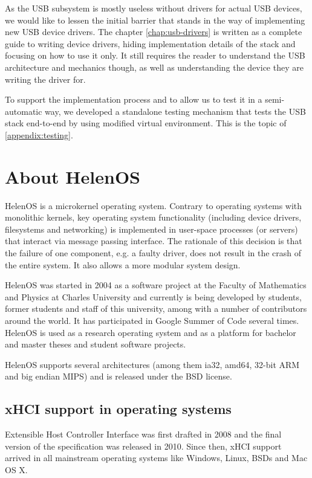 As the USB subsystem is mostly useless without drivers for actual USB devices,
we would like to lessen the initial barrier that stands in the way of
implementing new USB device drivers. The chapter \ref{chap:usb-drivers} is
written as a complete guide to writing device drivers, hiding implementation
details of the stack and focusing on how to use it only. It still requires the
reader to understand the USB architecture and mechanics though, as well as
understanding the device they are writing the driver for.

To support the implementation process and to allow us to test it in
a semi-automatic way, we developed a standalone testing mechanism that tests
the USB stack end-to-end by using modified virtual environment. This is the
topic of \ref{appendix:testing}.

\section{About HelenOS}
HelenOS is a microkernel operating system. Contrary to operating systems with
monolithic kernels, key operating system functionality (including device
drivers, filesystems and networking) is implemented in user-space processes (or
servers) that interact via message passing interface. The rationale of this
decision is that the failure of one component, e.g. a faulty driver, does not
result in the crash of the entire system. It also allows a more modular system
design.

HelenOS was started in 2004 as a software project at the Faculty of Mathematics
and Physics at Charles University and currently is being developed by students,
former students and staff of this university, among with a number of
contributors around the world. It has participated in Google Summer of Code
several times. HelenOS is used as a research operating system and as a platform
for bachelor and master theses and student software projects.

HelenOS supports several architectures (among them ia32, amd64, 32-bit ARM and
big endian MIPS) and is released under the BSD license.

\subsection{xHCI support in operating systems}

Extensible Host Controller Interface was first drafted in 2008 and the final
version of the specification was released in 2010. Since then, xHCI support
arrived in all mainstream operating systems like Windows, Linux, BSDs and Mac
OS X.

